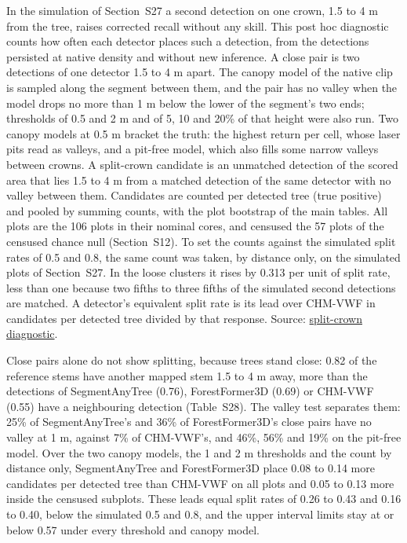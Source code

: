 \documentclass[10pt]{article}
\begin{document}
In the simulation of Section~S27 a second detection on one crown, 1.5 to 4 m
from the tree, raises corrected recall without any skill. This post hoc
diagnostic counts how often each detector places such a detection, from the
detections persisted at native density and without new inference. A close pair
is two detections of one detector 1.5 to 4 m apart. The canopy model of the
native clip is sampled along the segment between them, and the pair has no
valley when the model drops no more than 1 m below the lower of the segment's
two ends; thresholds of 0.5 and 2 m and of 5, 10 and 20\% of that height were
also run. Two canopy models at 0.5 m bracket the truth: the highest return per
cell, whose laser pits read as valleys, and a pit-free model, which also fills
some narrow valleys between crowns. A split-crown candidate is an unmatched
detection of the scored area that lies 1.5 to 4 m from a matched detection of
the same detector with no valley between them. Candidates are counted per
detected tree (true positive) and pooled by summing counts, with the plot
bootstrap of the main tables. All plots are the 106 plots in their nominal
cores, and censused the 57 plots of the censused chance null (Section~S12). To
set the counts against the simulated split rates of 0.5 and 0.8, the same count
was taken, by distance only, on the simulated plots of Section~S27. In the loose
clusters it rises by 0.313 per unit of split rate, less than one because two
fifths to three fifths of the simulated second detections are matched. A
detector's equivalent split rate is its lead over CHM-VWF in candidates per
detected tree divided by that response. Source: \href{https://github.com/devakellc/lidar-tree-benchmark/blob/main/results/split-crown-diagnostic-results.md}{split-crown
diagnostic}.

Close pairs alone do not show splitting, because trees stand close: 0.82 of the
reference stems have another mapped stem 1.5 to 4 m away, more than the
detections of SegmentAnyTree (0.76), ForestFormer3D (0.69) or CHM-VWF (0.55)
have a neighbouring detection (Table~S28). The valley test separates them: 25\%
of SegmentAnyTree's and 36\% of ForestFormer3D's close pairs have no valley at
1 m, against 7\% of CHM-VWF's, and 46\%, 56\% and 19\% on the pit-free model. Over
the two canopy models, the 1 and 2 m thresholds and the count by distance only,
SegmentAnyTree and ForestFormer3D place 0.08 to 0.14 more candidates per
detected tree than CHM-VWF on all plots and 0.05 to 0.13 more inside the
censused subplots. These leads equal split rates of 0.26 to 0.43 and 0.16 to
0.40, below the simulated 0.5 and 0.8, and the upper interval limits stay at or
below 0.57 under every threshold and canopy model.
\end{document}
